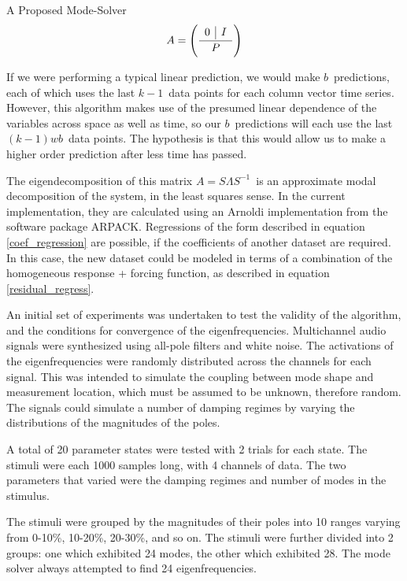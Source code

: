 \documentclass[a4paper,10pt]{report}
\numberwithin{equation}{section}
\begin{document}
{\begin{chapter}
\begin{section}{A Proposed Mode-Solver}
\begin{equation}
A = \left(
\frac{
\begin{array}{ c | c }
 0 &I 
\end{array}
}{P}\right)
\end{equation}
\par
If we were performing a typical linear prediction, we would make $b$\  predictions, each of which uses the last $k-1$\  data points for each column vector time series. However, this algorithm makes use of the presumed linear dependence of the variables across space as well as time, so our $b$\  predictions will each use the last $(k-1) wb$\  data points. The hypothesis is that this would allow us to make a higher order prediction after less time has passed. 
\par
The eigendecomposition of this matrix $A = S\Lambda S^{-1}$\  is an approximate modal decomposition of the system, in the least squares sense. In the current implementation, they are calculated using an Arnoldi implementation from the software package ARPACK. Regressions of the form described in equation \eqref{coef_regression} are possible, if the coefficients of another dataset are required. In this case, the new dataset could be modeled in terms of a combination of the homogeneous response + forcing function, as described in equation \eqref{residual_regress}. 
\par
An initial set of experiments was undertaken to test the validity of the algorithm, and the conditions for convergence of the eigenfrequencies. Multichannel audio signals were synthesized using all-pole filters and white noise. The activations of the eigenfrequencies were randomly distributed across the channels for each signal. This was intended to simulate the coupling between mode shape and measurement location, which must be assumed to be unknown, therefore random. The signals could simulate a number of damping regimes by varying the distributions of the magnitudes of the poles. 
\par
A total of 20 parameter states were tested with 2 trials for each state. The stimuli were each 1000 samples long, with 4 channels of data. The two parameters that varied were the damping regimes and number of modes in the stimulus. 
\par
The stimuli were grouped by the magnitudes of their poles into 10 ranges varying from 0-10\%, 10-20\%, 20-30\%, and so on. The stimuli were further divided into 2 groups: one which exhibited 24 modes, the other which exhibited 28. The mode solver always attempted to find 24 eigenfrequencies.

\end{section}
\end{chapter}}
\end{document}
